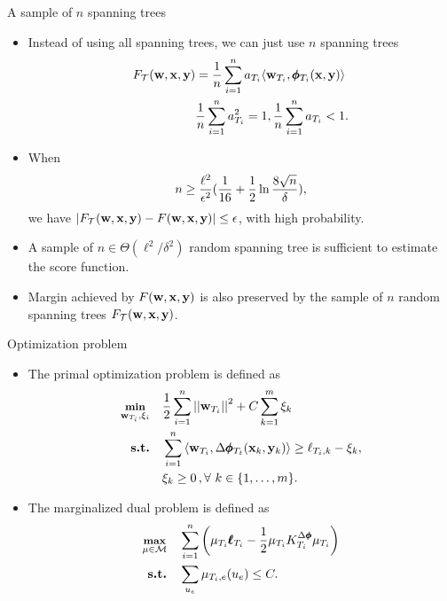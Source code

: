 \documentclass[first=dgreen,second=purple,logo=yellowexc]{aaltoslides}
\begin{document}
\begin{frame}{A sample of $n$ spanning trees}
	\begin{itemize}\footnotesize
		\item Instead of using all spanning trees, we can just use $n$ spanning trees
		\begin{align*}\footnotesize
			F_{\mathcal{T}}(\mathbf {w},\mathbf {x},\mathbf {y}) &= \frac{1}{n}\sum_{i=1}^{n}a_{T_i}\langle \mathbf {w}_{T_i}, \pmb \phi_{T_i}(\mathbf {x},\mathbf {y}) \rangle\\
			  &\frac{1}{n}\sum_{i=1}^{n}a_{T_i}^2=1,  \frac{1}{n}\sum_{i=1}^{n}a_{T_i}<1.
		\end{align*}
		\item When
		\begin{align*}\footnotesize
			n\ge\frac{\ell^2}{\epsilon^2}(\frac{1}{16}+\frac{1}{2}\ln\frac{8\sqrt{n}}{\delta}),
		\end{align*}
		we have $|F_{\mathcal{T}}(\mathbf {w},\mathbf {x},\mathbf {y})-F(\mathbf {w},\mathbf {x},\mathbf {y})|\le\epsilon$, with high probability.
		\item A sample of $n\in\Theta(\ell^2/\delta^2)$ random spanning tree is sufficient to estimate the score function.
		\item Margin achieved by $F(\mathbf {w},\mathbf {x},\mathbf {y})$ is also preserved by the sample of $n$ random spanning trees $F_{\mathcal{T}}(\mathbf {w},\mathbf {x},\mathbf {y})$.
	\end{itemize}
\end{frame}


\begin{frame}{Optimization problem}
	\begin{itemize}\footnotesize
		\item The primal optimization problem is defined as
		\begin{align*}\footnotesize
			\underset{\mathbf {w}_{T_i},\xi_i}{\textbf{min}} & \quad \frac{1}{2}\sum_{i=1}^{n}\left|\left| \mathbf {w}_{T_i} \right|\right|^2 + C\sum_{k=1}^{m}\xi_k\\
			\textbf{s.t.} & \quad \sum_{i=1}^{n}{ \langle \mathbf {w}_{T_i}, \Delta\pmb \phi_{T_t}(\mathbf {x}_k,\mathbf {y}_k) \rangle}  \geq \ell_{T_i,k} -  \xi_k, \\
			& \quad \xi_k\ge0\, , \forall\ k \in \{ 1,\dots,m \}.
		\end{align*}
		\item The marginalized dual problem is defined as
		\begin{align*}\footnotesize
			\underset{\mathbf {\mu}\in\mathcal{M}}{\textbf{max}} & \quad \sum_{i=1}^{n}\left( \mathbf {\mu}_{T_i}\pmb {\ell}_{T_i} - \frac{1}{2}\mathbf {\mu}_{T_i}K^{\Delta\pmb \phi}_{T_i}\mathbf {\mu}_{T_i}\right)\\
			\textbf{s.t.} & \quad \sum_{u_e}\mathbf {\mu}_{T_i,e}(u_e)\le C.
		\end{align*}
	\end{itemize}
\end{frame}
\end{document}
